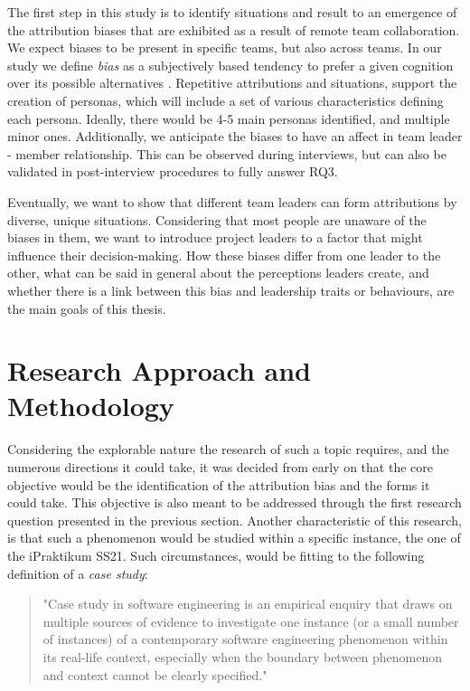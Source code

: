 The first step in this study is to identify situations and result to an emergence of the attribution biases that are exhibited as a result of remote team collaboration. We expect biases to be present in specific teams, but also across teams. In our study we define \textit{bias} as a subjectively based tendency to prefer a given cognition over its possible alternatives \cite{Kruglanski1983}. Repetitive attributions and situations, support the creation of personas, which will include a set of various characteristics defining each persona. Ideally, there would be 4-5 main personas identified, and multiple minor ones. Additionally, we anticipate the biases to have an affect in team leader - member relationship. This can be observed during interviews, but can also be validated in post-interview procedures to fully answer RQ3.

Eventually, we want to show that different team leaders can form attributions by diverse, unique situations. Considering that most people are unaware of the biases in them, we want to introduce project leaders to a factor that might influence their decision-making. How these biases differ from one leader to the other, what can be said in general about the perceptions leaders create, and whether there is a link between this bias and leadership traits or behaviours, are the main goals of this thesis.

\section{Research Approach and Methodology} \label{ResearchApproachAndMethodology}

Considering the explorable nature the research of such a topic requires, and the numerous directions it could take, it was decided from early on that the core objective would be the identification of the attribution bias and the forms it could take. This objective is also meant to be addressed through the first research question presented in the previous section. Another characteristic of this research, is that such a phenomenon would be studied within a specific instance, the one of the iPraktikum SS21. Such circumstances, would be fitting to the following definition of a \textit{case study}: 

\begin{quote}
"Case study in software engineering is an empirical enquiry that draws on multiple sources of evidence to investigate one instance (or a small number of instances) of a contemporary software engineering phenomenon within its real-life context, especially when the boundary between phenomenon and context cannot be clearly specified." \cite{Runeson2009}
\end{quote}

